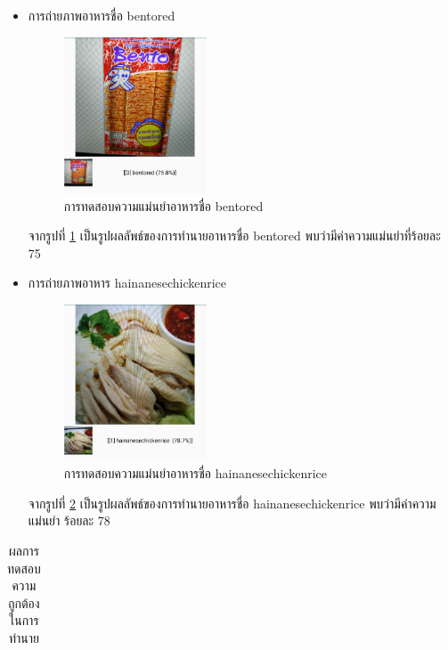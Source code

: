 \begin{itemize}
\begin{itemize}
	\item{การถ่ายภาพอาหารชื่อ bentored}

\begin{figure}[H]
	\centering
	\includegraphics[width=0.4\textwidth]{Figures/5/ben.png}
	\caption{การทดสอบความแม่นยำอาหารชื่อ bentored}
	\label{Fig:bentored}
\end{figure}
จากรูปที่ \ref{Fig:bentored} เป็นรูปผลลัพธ์ของการทำนายอาหารชื่อ bentored พบว่ามีค่าความแม่นยำที่ร้อยละ 75
\newpage

\end{itemize}



\begin{itemize}
	\item{การถ่ายภาพอาหาร hainanesechickenrice}

\begin{figure}[H]
	\centering
	\includegraphics[width=0.4\textwidth]{Figures/5/rice.png}
	\caption{การทดสอบความแม่นยำอาหารชื่อ hainanesechickenrice}
	\label{Fig:rice}
\end{figure}
จากรูปที่ \ref{Fig:rice} เป็นรูปผลลัพธ์ของการทำนายอาหารชื่อ hainanesechickenrice พบว่ามีค่าความแม่นยำ ร้อยละ 78
\newpage

\end{itemize}

\begin{table}[H]
	\caption{ผลการทดสอบความถูกต้องในการทำนาย}
    \label{tab:wrong}
    \centering
	\begin{tabular}{ | p{3cm} | p{3cm} | p{3cm} | p{3cm} | p{3cm} | }
		\hline


\end{tabular}
\end{table}
\end{itemize}
